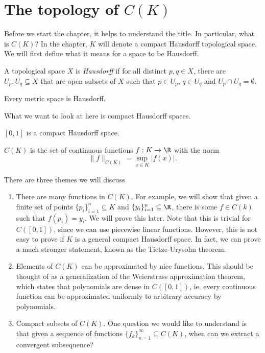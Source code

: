 \documentclass[a4paper]{article}
\begin{document}
\section{The topology of \texorpdfstring{$C(K)$}{C(K)}}
Before we start the chapter, it helps to understand the title. In particular, what is $C(K)$? In the chapter, $K$ will denote a compact Hausdorff topological space. We will first define what it means for a space to be Hausdorff.

\begin{defi}
  A topological space $X$ is \emph{Hausdorff} if for all distinct $p, q \in X$, there are $U_p, U_q \subseteq X$ that are open subsets of $X$ such that $p \in U_p$, $q\in U_q$ and $U_p\cap U_q = \emptyset$.
\end{defi}

\begin{eg}
  Every metric space is Hausdorff.
\end{eg}

What we want to look at here is compact Hausdorff spaces.
\begin{eg}
  $[0, 1]$ is a compact Hausdorff space.
\end{eg}

\begin{notation}
  $C(K)$ is the set of continuous functions $f: K \to \R$ with the norm
  \[
    \|f\|_{C(K)} = \sup_{x \in K} |f(x)|.
  \]
\end{notation}
There are three themes we will discuss
\begin{enumerate}
  \item There are many functions in $C(K)$. For example, we will show that given a finite set of points $\{p_i\}_{i = 1}^n \subseteq K$ and $\{y_i\}_{i = 1}^n \subseteq \R$, there is some $f \in C(k)$ such that $f(p_i) = y_i$. We will prove this later. Note that this is trivial for $C([0, 1])$, since we can use piecewise linear functions. However, this is not easy to prove if $K$ is a general compact Hausdorff space. In fact, we can prove a much stronger statement, known as the Tietze-Urysohn theorem.

  \item Elements of $C(K)$ can be approximated by nice functions. This should be thought of as a generalization of the Weierstrass approximation theorem, which states that polynomials are dense in $C([0, 1])$, ie. every continuous function can be approximated uniformly to arbitrary accuracy by polynomials.

  \item Compact subsets of $C(K)$. One question we would like to understand is that given a sequence of functions $\{f_k\}_{n = 1}^\infty \subseteq C(K)$, when can we extract a convergent subsequence?
\end{enumerate}
\end{document}
